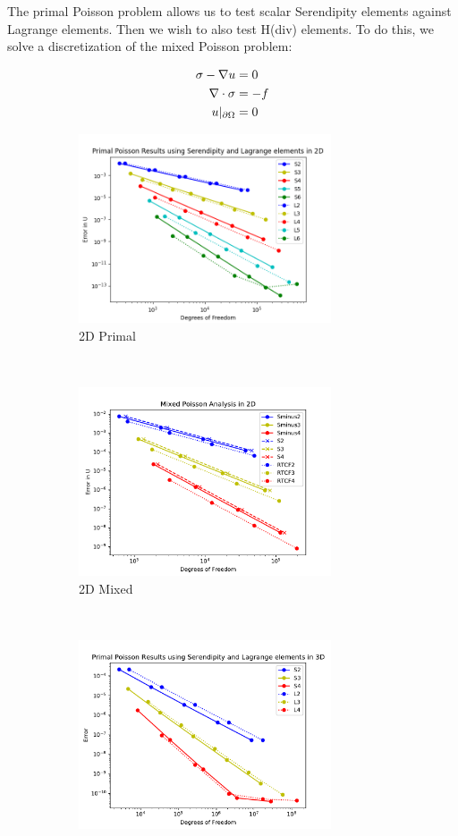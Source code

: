 \documentclass[manuscript,screen]{acmart}
\begin{document}
The primal Poisson problem allows us to test scalar Serendipity elements against Lagrange elements.  Then we wish to also test H(div) elements.  To do this, we solve a discretization of the mixed Poisson problem:

\begin{align}
     \sigma - \nabla u &= 0 \\
     \nabla \cdot \sigma &= -f \notag \\
     u\vert_{\partial \Omega} &= 0 \notag
\end{align}


\begin{figure}[h!]
  \centering
  \begin{subfigure}[h]{0.5\textwidth}
    \centering
    \includegraphics[height=2.2in]{2dPrimalPoisson.png}
    \caption{2D Primal}
    \label{fig:2dPrimalDofs}
  \end{subfigure}
  ~
  \begin{subfigure}[h]{0.5\textwidth}
    \centering
    \includegraphics[height=2.2in]{2dMixedPoissonDofs.pdf}
    \caption{2D Mixed}
    \label{fig:2dMixedDofsError}
  \end{subfigure} \\
  \begin{subfigure}[h]{0.5\textwidth}
    \centering
    \includegraphics[height=2.2in]{3dPrimalDofsError.pdf}

\end{subfigure}
\end{figure}
\end{document}
